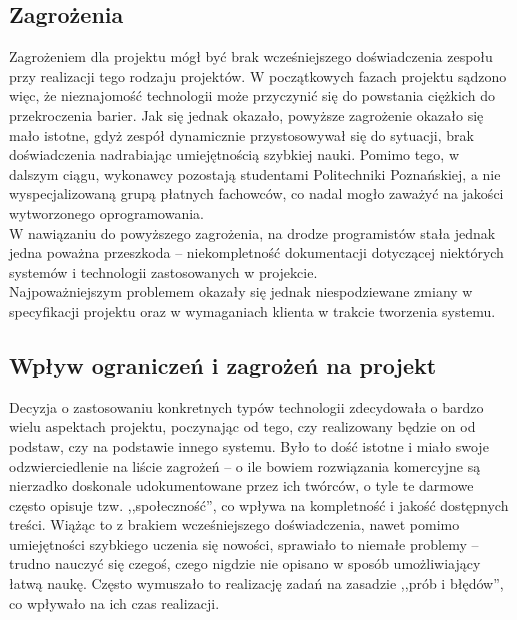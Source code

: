 \subsection{Zagrożenia}
\label{Chapter122}

Zagrożeniem dla projektu mógł być brak wcześniejszego doświadczenia zespołu przy realizacji tego rodzaju projektów. W początkowych fazach projektu sądzono więc, że nieznajomość technologii może przyczynić się do powstania ciężkich do przekroczenia barier. Jak się jednak okazało, powyższe zagrożenie okazało się mało istotne, gdyż zespół dynamicznie przystosowywał się do sytuacji, brak doświadczenia nadrabiając umiejętnością szybkiej nauki. Pomimo tego, w dalszym ciągu, wykonawcy pozostają studentami Politechniki Poznańskiej, a nie wyspecjalizowaną grupą płatnych fachowców, co nadal mogło zaważyć na jakości wytworzonego oprogramowania. \\

W nawiązaniu do powyższego zagrożenia, na drodze programistów stała jednak jedna poważna przeszkoda -- niekompletność dokumentacji dotyczącej niektórych systemów i technologii zastosowanych w projekcie. \\

Najpoważniejszym problemem okazały się jednak niespodziewane zmiany w specyfikacji projektu oraz w wymaganiach klienta w trakcie tworzenia systemu.

\subsection{Wpływ ograniczeń i zagrożeń na projekt}
\label{Chapter123}

Decyzja o zastosowaniu konkretnych typów technologii zdecydowała o bardzo wielu aspektach projektu, poczynając od tego, czy realizowany będzie on od podstaw, czy na podstawie innego systemu. Było to dość istotne i miało swoje odzwierciedlenie na liście zagrożeń -- o ile bowiem rozwiązania komercyjne są nierzadko doskonale udokumentowane przez ich twórców, o tyle te darmowe często opisuje tzw. ,,społeczność'', co wpływa na kompletność i jakość dostępnych treści. Wiążąc to z brakiem wcześniejszego doświadczenia, nawet pomimo umiejętności szybkiego uczenia się nowości, sprawiało to niemałe problemy -- trudno nauczyć się czegoś, czego nigdzie nie opisano w sposób umożliwiający łatwą naukę. Często wymuszało to realizację zadań na zasadzie ,,prób i błędów'', co wpływało na ich czas realizacji. \\

